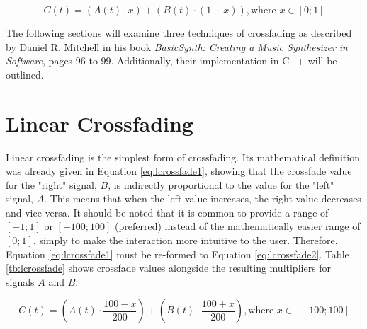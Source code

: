 \documentclass[12pt,twoside]{report}
\begin{document}
\begin{equation}
  C(t) = (A(t) \cdot x) + (B(t) \cdot (1 - x)), \text{where } x \in [0;1]
  \label{eq:lcrossfade1}
\end{equation}


The following sections will examine three techniques of crossfading as described by Daniel R. Mitchell in his book \emph{BasicSynth: Creating a Music Synthesizer in Software}, pages 96 to 99. Additionally, their implementation in C++ will be outlined.

\section{Linear Crossfading}

Linear crossfading is the simplest form of crossfading. Its mathematical definition was already given in Equation \ref{eq:lcrossfade1}, showing that the crossfade value for the "right" signal, $B$, is indirectly proportional to the value for the "left" signal, $A$. This means that when the left value increases, the right value decreases and vice-versa. It should be noted that it is common to provide a range of $[-1;1]$ or $[-100;100]$ (preferred) instead of the mathematically easier range of $[0;1]$, simply to make the interaction more intuitive to the user. Therefore, Equation \ref{eq:lcrossfade1} must be re-formed to Equation \ref{eq:lcrossfade2}. Table \ref{tb:lcrossfade} shows crossfade values alongside the resulting multipliers for signals $A$ and $B$.

\begin{equation}
  C(t) = (A(t) \cdot \frac{100 - x}{200}) + (B(t) \cdot \frac{100 + x}{200}), \text{where } x \in [-100;100]
  \label{eq:lcrossfade2}
\end{equation}
\end{document}
